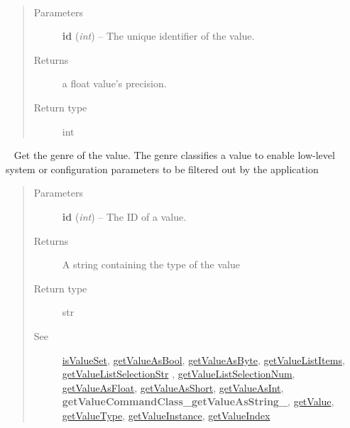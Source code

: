 \documentclass[letterpaper,10pt,english]{sphinxmanual}
\begin{document}
\begin{fulllineitems}
\begin{fulllineitems}
\end{fulllineitems}


\begin{fulllineitems}
\label{libopenzwave:libopenzwave.PyManager.getValueFloatPrecision}~\begin{quote}\begin{description}
\item[{Parameters}] \leavevmode
\textbf{id} (\emph{int}) -- The unique identifier of the value.

\item[{Returns}] \leavevmode
a float value's precision.

\item[{Return type}] \leavevmode
int

\end{description}\end{quote}

\end{fulllineitems}


\begin{fulllineitems}
\label{libopenzwave:libopenzwave.PyManager.getValueGenre}~\label{libopenzwave:getvaluegenre}
Get the genre of the value.  The genre classifies a value to enable
low-level system or configuration parameters to be filtered out
by the application
\begin{quote}\begin{description}
\item[{Parameters}] \leavevmode
\textbf{id} (\emph{int}) -- The ID of a value.

\item[{Returns}] \leavevmode
A string containing the type of the value

\item[{Return type}] \leavevmode
str

\item[{See}] \leavevmode
{\hyperref[libopenzwave:isvalueset]{isValueSet}}, {\hyperref[libopenzwave:getvalueasbool]{getValueAsBool}}, {\hyperref[libopenzwave:getvalueasbyte]{getValueAsByte}}, {\hyperref[libopenzwave:getvaluelistitems]{getValueListItems}}, {\hyperref[libopenzwave:getvaluelistselectionstr]{getValueListSelectionStr}} , {\hyperref[libopenzwave:getvaluelistselectionnum]{getValueListSelectionNum}}, {\hyperref[libopenzwave:getvalueasfloat]{getValueAsFloat}}, {\hyperref[libopenzwave:getvalueasshort]{getValueAsShort}}, {\hyperref[libopenzwave:getvalueasint]{getValueAsInt}}, {\color{red}\bfseries{}getValueCommandClass\_getValueAsString\_}, {\hyperref[libopenzwave:getvalue]{getValue}}, {\hyperref[libopenzwave:getvaluetype]{getValueType}}, {\hyperref[libopenzwave:getvalueinstance]{getValueInstance}}, {\hyperref[libopenzwave:getvalueindex]{getValueIndex}}


\end{description}
\end{quote}
\end{fulllineitems}
\end{fulllineitems}
\end{document}
